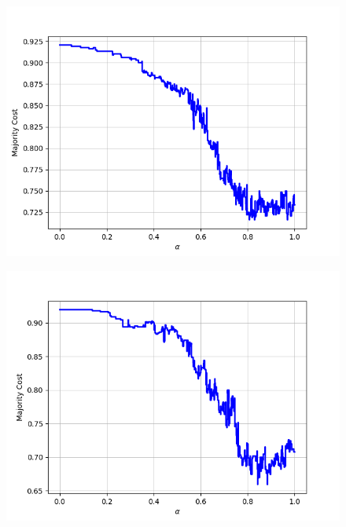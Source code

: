 \begin{figure}[H]
\begin{minipage}{.24\textwidth}
  {\includegraphics[width=\linewidth]{plots/omniglot-intra-sc/Braille}}
\end{minipage}
\begin{minipage}{.24\textwidth}
  \centering
  {\includegraphics[width=\linewidth]{plots/omniglot-intra-sc/Burmese_(Myanmar)}}
\end{minipage}
\begin{minipage}{.24\textwidth}
  \centering

\end{minipage}
\end{figure}
